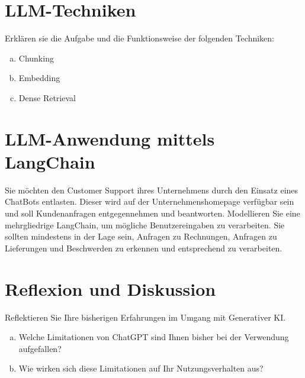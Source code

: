 \documentclass[12pt,ngerman]{AssignmentClass}
\begin{document}
    \section{LLM-Techniken}
        Erklären sie die Aufgabe und die Funktionsweise der folgenden Techniken:
        \begin{enumerate}[a)]
            \item Chunking
            \item Embedding
            \item Dense Retrieval
        \end{enumerate}


    \section{LLM-Anwendung mittels LangChain}
        Sie möchten den Customer Support ihres Unternehmens durch den Einsatz eines ChatBots entlasten. Dieser wird auf der Unternehmenshomepage verfügbar sein und soll Kundenanfragen entgegennehmen und beantworten.
        Modellieren Sie eine mehrgliedrige LangChain, um mögliche Benutzereingaben zu verarbeiten. Sie sollten mindestens in der Lage sein, Anfragen zu Rechnungen, Anfragen zu Lieferungen und Beschwerden zu erkennen und entsprechend zu verarbeiten.


    \section{Reflexion und Diskussion}
        Reflektieren Sie Ihre bisherigen Erfahrungen im Umgang mit Generativer KI.
        \begin{enumerate}[a)]
            \item Welche Limitationen von ChatGPT sind Ihnen bisher bei der Verwendung aufgefallen?
            \item Wie wirken sich diese Limitationen auf Ihr Nutzungsverhalten aus?
        \end{enumerate}
\end{document}
